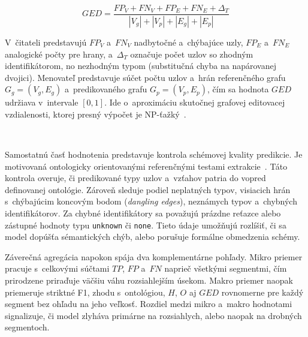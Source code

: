 \begin{equation}\label{eq:ged}
GED = \frac{FP_V + FN_V + FP_E + FN_E + \Delta_T}{|V_g| + |V_p| + |E_g| + |E_p|}
\end{equation}

V~čitateli predstavujú $FP_V$ a~$FN_V$ nadbytočné a~chýbajúce uzly, $FP_E$ a~$FN_E$ analogické počty pre hrany, a~$\Delta_T$ označuje počet uzlov so zhodným identifikátorom, no nezhodným typom (substitučná chyba na napárovanej dvojici). Menovateľ predstavuje súčet počtu uzlov a~hrán referenčného grafu $G_g = (V_g, E_g)$ a~predikovaného grafu $G_p = (V_p, E_p)$, čím sa hodnota $GED$ udržiava v~intervale $[0, 1]$. Ide o~aproximáciu skutočnej grafovej editovacej vzdialenosti, ktorej presný výpočet je NP-ťažký~\cite{ghanem2025kgeval}.

\

Samostatnú časť hodnotenia predstavuje kontrola schémovej kvality predikcie. Je motivovaná ontologicky orientovanými referenčnými testami extrakcie~\cite{mihindukulasooriya2023text2kgbench}. Táto kontrola overuje, či predikované typy uzlov a~vzťahov patria do vopred definovanej ontológie. Zároveň sleduje podiel neplatných typov, visiacich hrán s~chýbajúcim koncovým bodom (\textit{dangling edges}), neznámych typov a~chybných identifikátorov. Za chybné identifikátory sa považujú prázdne reťazce alebo zástupné hodnoty typu \texttt{unknown} či \texttt{none}. Tieto údaje umožňujú rozlíšiť, či sa model dopúšťa sémantických chýb, alebo porušuje formálne obmedzenia schémy.

Záverečná agregácia napokon spája dva komplementárne pohľady. Mikro priemer pracuje s~celkovými súčtami $TP$, $FP$ a~$FN$ naprieč všetkými segmentmi, čím prirodzene priraďuje väčšiu váhu rozsiahlejším úsekom. Makro priemer naopak priemeruje striktné F1, zhodu s~ontológiou, $H$, $O$ aj $GED$ rovnomerne pre každý segment bez ohľadu na jeho veľkosť. Rozdiel medzi mikro a~makro hodnotami signalizuje, či model zlyháva primárne na rozsiahlych, alebo naopak na drobných segmentoch.
\

